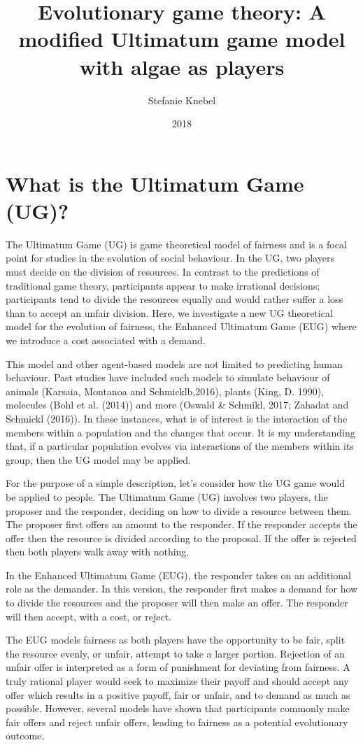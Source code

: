 \documentclass[]{article}
\title{Evolutionary game theory: A modified Ultimatum game model with algae as
players}
\author{Stefanie Knebel}
\date{2018}
\begin{document}
\maketitle

\section{What is the Ultimatum Game
(UG)?}\label{what-is-the-ultimatum-game-ug}

The Ultimatum Game (UG) is game theoretical model of fairness and is a
focal point for studies in the evolution of social behaviour. In the UG,
two players must decide on the division of resources. In contrast to the
predictions of traditional game theory, participants appear to make
irrational decisions; participants tend to divide the resources equally
and would rather suffer a loss than to accept an unfair division. Here,
we investigate a new UG theoretical model for the evolution of fairness,
the Enhanced Ultimatum Game (EUG) where we introduce a cost associated
with a demand.

This model and other agent-based models are not limited to predicting
human behaviour. Past studies have included such models to simulate
behaviour of animals (Karsaia, Montanoa and Schmicklb,2016), plants
(King, D. 1990), molecules (Bohl et al. (2014)) and more (Oswald \&
Schmikl, 2017; Zahadat and Schmickl (2016)). In these instances, what is
of interest is the interaction of the members within a population and
the changes that occur. It is my understanding that, if a particular
population evolves via interactions of the members within its group,
then the UG model may be applied.

For the purpose of a simple description, let's consider how the UG game
would be applied to people. The Ultimatum Game (UG) involves two
players, the proposer and the responder, deciding on how to divide a
resource between them. The proposer first offers an amount to the
responder. If the responder accepts the offer then the resource is
divided according to the proposal. If the offer is rejected then both
players walk away with nothing.

In the Enhanced Ultimatum Game (EUG), the responder takes on an
additional role as the demander. In this version, the responder first
makes a demand for how to divide the resources and the proposer will
then make an offer. The responder will then accept, with a cost, or
reject.

The EUG models fairness as both players have the opportunity to be fair,
split the resource evenly, or unfair, attempt to take a larger portion.
Rejection of an unfair offer is interpreted as a form of punishment for
deviating from fairness. A truly rational player would seek to maximize
their payoff and should accept any offer which results in a positive
payoff, fair or unfair, and to demand as much as possible. However,
several models have shown that participants commonly make fair offers
and reject unfair offers, leading to fairness as a potential
evolutionary outcome.
\end{document}

